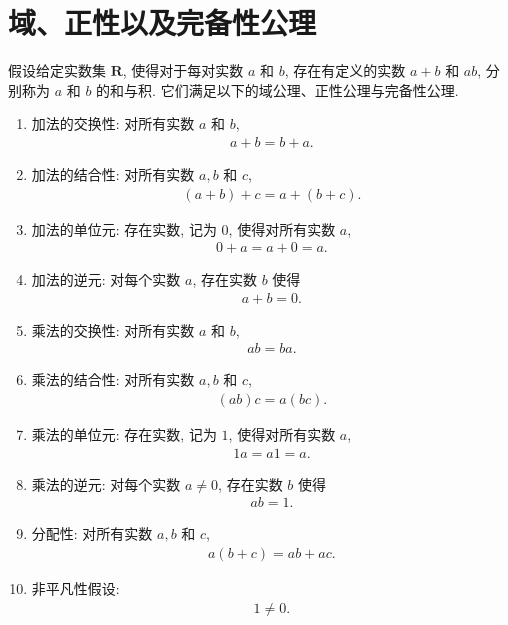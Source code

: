 \documentclass[../../main.tex]{subfiles}
\begin{document}
\section{域、正性以及完备性公理}\label{section:ch01-域正性完备性}

假设给定实数集 $\mathbf{R}$, 使得对于每对实数 $a$ 和 $b$, 存在有定义的实数 $a+b$ 和 $ab$, 分别称为 $a$ 和 $b$ 的和与积. 它们满足以下的域公理、正性公理与完备性公理.

\begin{definition}[域公理]\label{definition:ch01-域公理}
\begin{enumerate}[(1)]
\item 加法的交换性: 对所有实数 $a$ 和 $b$,
\begin{align*}
a+b=b+a.
\end{align*}
\item 加法的结合性: 对所有实数 $a,b$ 和 $c$,
\begin{align*}
(a+b)+c=a+(b+c).
\end{align*}
\item 加法的单位元: 存在实数, 记为 $0$, 使得对所有实数 $a$,
\begin{align*}
0+a=a+0=a.
\end{align*}
\item 加法的逆元: 对每个实数 $a$, 存在实数 $b$ 使得
\begin{align*}
a+b=0.
\end{align*}
\item 乘法的交换性: 对所有实数 $a$ 和 $b$,
\begin{align*}
ab=ba.
\end{align*}
\item 乘法的结合性: 对所有实数 $a,b$ 和 $c$,
\begin{align*}
(ab)c=a(bc).
\end{align*}
\item 乘法的单位元: 存在实数, 记为 $1$, 使得对所有实数 $a$,
\begin{align*}
1a=a1=a.
\end{align*}
\item 乘法的逆元: 对每个实数 $a\neq 0$, 存在实数 $b$ 使得
\begin{align*}
ab=1.
\end{align*}
\item 分配性: 对所有实数 $a,b$ 和 $c$,
\begin{align*}
a(b+c)=ab+ac.
\end{align*}
\item 非平凡性假设:
\begin{align*}
1\neq 0.
\end{align*}
\end{enumerate}
\end{definition}
\end{document}
